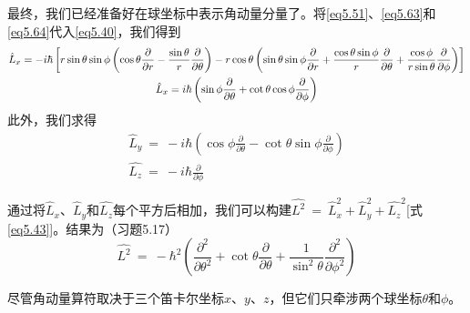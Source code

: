 \documentclass[12pt,a4paper,openany]{ctexbook}
\newcommand{\paren}[1]{\left( #1 \right)}
\begin{document}
\begin{flushleft}
最终，我们已经准备好在球坐标中表示角动量分量了。将\eqref{eq5.51}、\eqref{eq5.63}和\eqref{eq5.64}代入\eqref{eq5.40}，我们得到
\begin{gather}
    \hat{L}_x = -i\hbar\left[ r\sin\theta\sin\phi\left( \cos\theta\frac{\partial}{\partial r} - \frac{\sin\theta}{r}\frac{\partial}{\partial\theta} \right) - r\cos\theta\left( \sin\theta\sin\phi\frac{\partial}{\partial r} + \frac{\cos\theta\sin\phi}{r}\frac{\partial}{\partial\theta} + \frac{\cos\phi}{r\sin\theta}\frac{\partial}{\partial\phi} \right) \right] \notag \\
    \hat{L}_x = i\hbar\left( \sin\phi\frac{\partial}{\partial\theta} + \cot\theta\cos\phi\frac{\partial}{\partial\phi} \right) \label{eq5.65}
\end{gather}
此外，我们求得
\begin{gather}
    \hat{L}_y\ =\ -i\hbar\paren{\cos\phi\frac{\partial}{\partial\theta}-\cot\theta\sin\phi\frac{\partial}{\partial\phi}} \label{eq5.66} \\
    \hat{L_z}\ =\ -i\hbar\frac{\partial}{\partial\phi} \label{eq5.67}
\end{gather}

通过将$\hat{L}_x$、$\hat{L}_y$和$\hat{L_z}$每个平方后相加，我们可以构建$\hat{L^2}\ =\ \hat{L}_x^2+\hat{L}_y^2+\hat{L_z}^2$[式\eqref{eq5.43}]。结果为（习题5.17）
\begin{equation}
    \hat{L^2}\ =\ -\hbar^2(\frac{\partial^2}{\partial\theta^2}+\cot\theta\frac{\partial}{\partial\theta}+\frac{1}{\sin^2\theta}\frac{\partial^2}{\partial\phi^2}) \label{eq5.68}
\end{equation}

尽管角动量算符取决于三个笛卡尔坐标$x$、$y$、$z$，但它们只牵涉两个球坐标$\theta$和$\phi$。
\end{flushleft}
\end{document}
